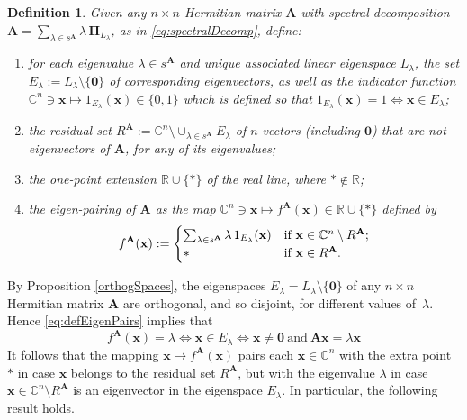 \documentclass[11pt]{article}
\newcommand \R { \mathbb{R} }
\newcommand \C { \mathbb{C} }
\newtheorem{definition}[theorem]{Definition}
\begin{document}
\begin{definition} \label{defn:eigenPairing}
Given any $n \times n$ Hermitian matrix $ \mathbf A$ with spectral decomposition 
 \( \mathbf A 
 = \sum _{ \lambda \in s^{ \mathbf A} } \lambda \, \boldsymbol \Pi _{ L_\lambda } \), 
as in \eqref{eq:spectralDecomp}, define:
 \begin{enumerate}
	\item for each eigenvalue $ \lambda \in s^{ \mathbf A}$
	and unique associated linear eigenspace $ L_\lambda $, 
	the set $ E_\lambda := L_\lambda \setminus \{ \mathbf 0 \} $ of corresponding eigenvectors, 
	as well as the \emph{indicator function} 
 \( \C^n \owns \mathbf x \mapsto 1_{ E_\lambda } ( \mathbf x) \in \{0, 1\} \) 
which is defined so that
 \( 1_{ E_\lambda } ( \mathbf x) = 1 \Longleftrightarrow \mathbf x \in E_\lambda \);
%
		\item the \emph{residual set}
 \( R^{ \mathbf A} := \C^n \setminus \cup _{ \lambda \in s^{ \mathbf A} } E_\lambda \) 
 	of $n$-vectors (including $ \mathbf 0$)
	that are not eigenvectors of $ \mathbf A$, for any of its eigenvalues;  
	\item the \emph{one-point extension} $ \R \cup \{*\} $ of the real line, 
	where $ * \not\in \R $;
	\item the \emph{eigen-pairing} of $ \mathbf A$ as the map
 \( \C^n \owns \mathbf x \mapsto f^{ \mathbf A} ( \mathbf x) \in \R \cup \{*\} \)
 	 defined by 
\begin{equation} \label{eq:defEigenPairs}
	f^{ \mathbf A} ( \mathbf x) := \begin{cases}
 	  \sum _{ \lambda \in s^{ \mathbf A}} \lambda \, 1_{ E_\lambda } ( \mathbf x)
  	& \text{if $ \mathbf x \in \C^n \setminus R^{ \mathbf A} $}; \\
  * & \text{if $ \mathbf x \in R^{ \mathbf A} $}.
\end{cases}
\end{equation}
\end{enumerate}
\end{definition}

By Proposition \ref{orthogSpaces}, 
the eigenspaces $ E_\lambda = L_\lambda \setminus \{ \mathbf 0 \}$ 
of any $n \times n$ Hermitian matrix $ \mathbf A$ are orthogonal, 
and so disjoint, for different values of~$ \lambda $.
Hence \eqref{eq:defEigenPairs} implies that 
\begin{equation} \label{eq:keyEq}
	f^{ \mathbf A} ( \mathbf x) = \lambda \Longleftrightarrow \mathbf x \in E_\lambda 
  \Longleftrightarrow \mathbf x \ne \mathbf 0 \ \text{and} \ \mathbf {Ax} = \lambda \mathbf x 
\end{equation}
It follows that the mapping $ \mathbf x \mapsto f^{ \mathbf A} ( \mathbf x) $ 
pairs each $ \mathbf x \in \C^n $ 
with the extra point $*$ in case $ \mathbf x$ belongs to the residual set $ R^{ \mathbf A} $,
but with the eigenvalue $ \lambda $ in case $ \mathbf x \in \C^n \setminus R^{ \mathbf A} $
is an eigenvector in the eigenspace $ E_\lambda $.
In particular, the following result holds.
\end{document}
